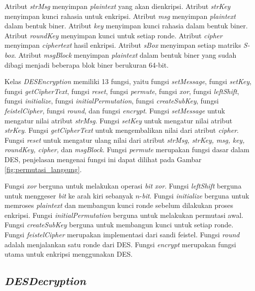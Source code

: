 Atribut \textit{strMsg} menyimpan \textit{plaintext} yang akan dienkripsi. Atribut \textit{strKey} menyimpan kunci rahasia untuk enkripsi. Atribut \textit{msg} menyimpan \textit{plaintext} dalam bentuk biner. Atribut \textit{key} menyimpan kunci rahasia dalam bentuk biner. Atribut \textit{roundKey} menyimpan kunci untuk setiap ronde. Atribut \textit{cipher} menyimpan \textit{ciphertext} hasil enkripsi. Atribut \textit{sBox} menyimpan setiap matriks \textit{S-box}. Atribut \textit{msgBlock} menyimpan \textit{plaintext} dalam bentuk biner yang sudah dibagi menjadi beberapa blok biner berukuran 64-bit.

Kelas \textit{DESEncryption} memiliki 13 fungsi, yaitu fungsi \textit{setMessage}, fungsi \textit{setKey}, fungsi \textit{getCipherText}, fungsi \textit{reset}, fungsi \textit{permute}, fungsi \textit{xor}, fungsi \textit{leftShift}, fungsi \textit{initialize}, fungsi \textit{initialPermutation}, fungsi \textit{createSubKey}, fungsi \textit{feistelCipher}, fungsi \textit{round}, dan fungsi \textit{encrypt}. Fungsi \textit{setMessage} untuk mengatur nilai atribut \textit{strMsg}. Fungsi \textit{setKey} untuk mengatur nilai atribut \textit{strKey}. Fungsi \textit{getCipherText} untuk mengembalikan nilai dari atribut \textit{cipher}. Fungsi \textit{reset} untuk mengatur ulang nilai dari atribut \textit{strMsg, strKey, msg, key, roundKey, cipher,} dan \textit{msgBlock}. Fungsi \textit{permute} merupakan fungsi dasar dalam DES, penjelasan mengenai fungsi ini dapat dilihat pada Gambar \ref{fig:permutasi_langsung}.

Fungsi \textit{xor} berguna untuk melakukan operasi \textit{bit xor}. Fungsi \textit{leftShift} berguna untuk menggeser \textit{bit} ke arah kiri sebanyak \begin{math}n\end{math}-\textit{bit}. Fungsi \textit{initialize} berguna untuk memroses \textit{plaintext} dan membangun kunci ronde sebelum dilakukan proses enkripsi. Fungsi \textit{initialPermutation} berguna untuk melakukan permutasi awal. Fungsi \textit{createSubKey} berguna untuk membangun kunci untuk setiap ronde. Fungsi \textit{feistelCipher} merupakan implementasi dari sandi feistel. Fungsi \textit{round} adalah menjalankan satu ronde dari DES. Fungsi \textit{encrypt} merupakan fungsi utama untuk enkripsi menggunakan DES.

\subsection{\textit{DESDecryption}}

